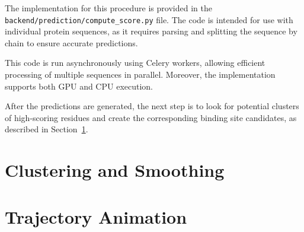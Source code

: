 \sloppy
The implementation for this procedure is provided in the \lstinline!backend/prediction/compute_score.py! file. The code is intended for use with individual protein sequences, as it requires parsing and splitting the sequence by chain to ensure accurate predictions.

This code is run asynchronously using Celery workers, allowing efficient processing of multiple sequences in parallel. Moreover, the implementation supports both GPU and CPU execution.

After the predictions are generated, the next step is to look for potential clusters of high-scoring residues and create the corresponding binding site candidates, as described in Section~\ref{sec:clustering}.

\section{Clustering and Smoothing}
\label{sec:clustering}


\section{Trajectory Animation}
\label{sec:trajectory}

